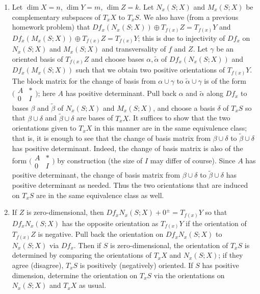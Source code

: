 \documentclass[11pt,leqno]{article}
\theoremstyle{plain}
\theoremstyle{definition}
\numberwithin{equation}{section}
\numberwithin{lem}{section}
\begin{document}
\begin{enumerate}
\begin{enumerate}
        \item Let $\dim X = n$, $\dim Y = m$, $\dim Z = k$. Let $N_x(S;X)$ and $M_x(S;X)$ be complementary subspaces of $T_xX$ to $T_xS$. We also have (from a previous homework problem) that $Df_x(N_x(S;X)) \oplus T_{f(x)}Z = T_{f(x)}Y$ and $Df_x(M_x(S;X)) \oplus T_{f(x)}Z = T_{f(x)}Y$; this is due to injectivity of $Df_x$ on $N_x(S;X)$ and $M_x(S;X)$ and transversality of $f$ and $Z$. Let $\gamma$ be an oriented basis of $T_{f(x)}Z$ and choose bases $\alpha,\tilde\alpha$ of $Df_x(N_x(S;X))$ and $Df_x(M_x(S;X))$ such that we obtain two positive orientations of $T_{f(x)}Y$. The block matrix for the change of basis from $\alpha\cup\gamma$ to $\tilde\alpha\cup\gamma$ is of the form $\big(\!\begin{smallmatrix}
            A & \ast \\ 0 & I
        \end{smallmatrix}\!\big)$; here $A$ has positive determinant. Pull back $\alpha$ and $\tilde\alpha$ along $Df_x$ to bases $\beta$ and $\tilde\beta$ of $N_x(S;X)$ and $M_x(S;X)$, and choose a basis $\delta$ of $T_xS$ so that $\beta\cup\delta$ and $\tilde\beta\cup\delta$ are bases of $T_xX$. It suffices to show that the two orientations given to $T_xX$ in this manner are in the same equivalence class; that is, it is enough to see that the change of basis matrix from $\beta\cup\delta$ to $\tilde\beta\cup\delta$ has positive determinant. Indeed, the change of basis matrix is also of the form $\big(\!\begin{smallmatrix}
            A & \ast \\ 0 & I
        \end{smallmatrix}\!\big)$ by construction (the size of $I$ may differ of course). Since $A$ has positive determinant, the change of basis matrix from $\beta\cup\delta$ to $\tilde\beta\cup\delta$ has positive determinant as needed. Thus the two orientations that are induced on $T_xS$ are in the same equivalence class as well.
        \item If $Z$ is zero-dimensional, then $Df_xN_x(S;X) + 0^\pm = T_{f(x)}Y$ so that $Df_xN_x(S;X)$ has the opposite orientation as $T_{f(x)}Y$ if the orientation of $T_{f(x)}Z$ is negative. Pull back the orientation on $Df_xN_x(S;X)$ to $N_x(S;X)$ via $Df_x$. Then if $S$ is zero-dimensional, the orientation of $T_xS$ is determined by comparing the orientations of $T_xX$ and $N_x(S;X)$; if they agree (disagree), $T_xS$ is positively (negatively) oriented. If $S$ has positive dimension, determine the orientation on $T_xS$ via the orientations on $N_x(S;X)$ and $T_xX$ as usual. 
        

\end{enumerate}
\end{enumerate}
\end{document}

